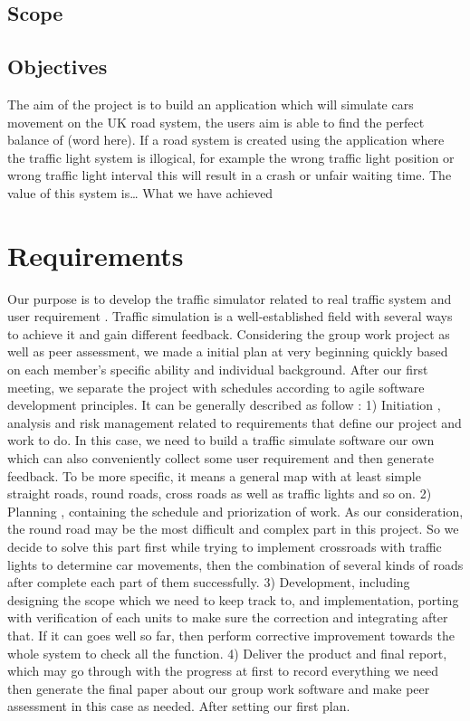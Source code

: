 \documentclass[11pt]{article}
\begin{document}
	\subsection{Scope}%
	
	\subsection{Objectives} %
	The aim of the project is to build an application which will simulate cars movement on the UK road system, the users aim is able to find the perfect balance of (word here). If a road system is created using the application where the traffic light system is illogical, for example the wrong traffic light position or wrong traffic light interval this will result in a crash or unfair waiting time.
	The value of this system is…
	What we have achieved 
	\section{Requirements} %
	Our purpose is to develop the traffic simulator related to real traffic system and user requirement . Traffic simulation is a well-established field with several ways to achieve it and gain different feedback.           Considering the group work project as well as peer assessment, we made a initial plan at very beginning quickly based on each member’s specific ability and individual background. After our first meeting, we separate the project with schedules according to agile software development principles. It can be generally described as follow :
1)	Initiation , analysis and risk management related to requirements that define our project and work to do.
 In this case, we need to build a traffic simulate software our own which can also conveniently collect some user requirement and then generate feedback. To be more specific, it means a general map with at least simple straight roads, round roads, cross roads as well as traffic lights and so on.
2)	Planning , containing the schedule and priorization of work.
As our consideration, the round road may be the most difficult and complex part in this project. So we decide to solve this part first while trying to implement crossroads with traffic lights to determine car movements, then the combination of several kinds of roads after complete each part of them successfully.  
3)	Development, including designing the scope which we need to keep track to, and implementation, porting with verification of each units to make sure the correction and integrating after that. If it can goes well so far, then perform corrective improvement towards the whole system to check all the function.
4)	Deliver the product and final report, which may go through with the progress at first to record everything we need then generate the final paper about our group work software and make peer assessment in this case as needed.
After setting our first plan.
\end{document}
